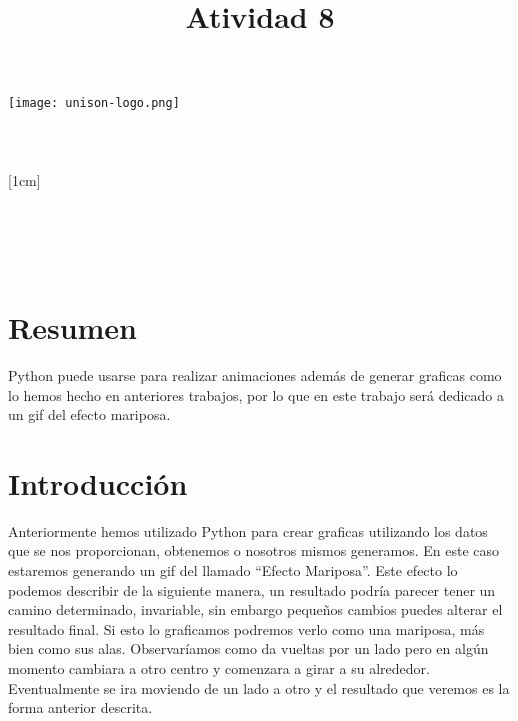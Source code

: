 \documentclass[a4paper,12pt]{article}
\title{Atividad 8}
\author{}
\newcommand{\vacio}{\textcolor{white}{holacaracola}}
\newcommand{\director}{Carlos Lizárraga Celaya}
\begin{document}
\begin{titlepage}
\begin{center}
\vspace{1cm}

\texttt{[image: unison-logo.png]}
\\[0.5cm]
{\fontsize{24}{6}\selectfont{UNIVERSIDAD DE SONORA}}\\
[1em]
{\fontsize{16}{5}\selectfont{DEPARTAMENTO DE FÍSICA}}\\
[4em]
\textcolor{azulportada}
{\fontsize{30}{5}\selectfont{\textsc{\thetitle}}}\\
[1cm]
{\fontsize{16}{5}\selectfont{Alumno:}}\\
[0.2cm]
{\fontsize{14}{5}\selectfont{Luis Alfonso Torres Flores}}\\
[1cm]
{\fontsize{16}{5}\selectfont{Profesor}}\\
[0.2cm]
{\fontsize{16}{5}\selectfont{\director}}\\
[4.5cm]
{\fontsize{14}{5}\selectfont{26 de Abril de 2017}}\\
[4cm]
\end{center}
\restoregeometry
\end{titlepage}

\newpage
\renewcommand{\headrulewidth}{0.5pt}
\fancyhead[L]{\vacio}
\newpage
\section*{Resumen}
\noindent
Python puede usarse para realizar animaciones además de generar graficas como lo hemos hecho en anteriores trabajos, por lo que en este trabajo será dedicado a un gif del efecto mariposa.
	
\section*{Introducción}
\noindent
Anteriormente hemos utilizado Python para crear graficas utilizando los datos que se nos proporcionan, obtenemos o nosotros mismos generamos. En este caso estaremos generando un gif del llamado “Efecto Mariposa”. Este efecto lo podemos describir de la siguiente manera, un resultado podría parecer tener un camino determinado, invariable, sin embargo pequeños cambios puedes alterar el resultado final. Si esto lo graficamos podremos verlo como una mariposa, más bien como sus alas. Observaríamos como da vueltas por un lado pero en algún momento cambiara a otro centro y comenzara a girar a su alrededor. Eventualmente se ira moviendo de un lado a otro y el resultado que veremos es la forma anterior descrita.
\end{document}
